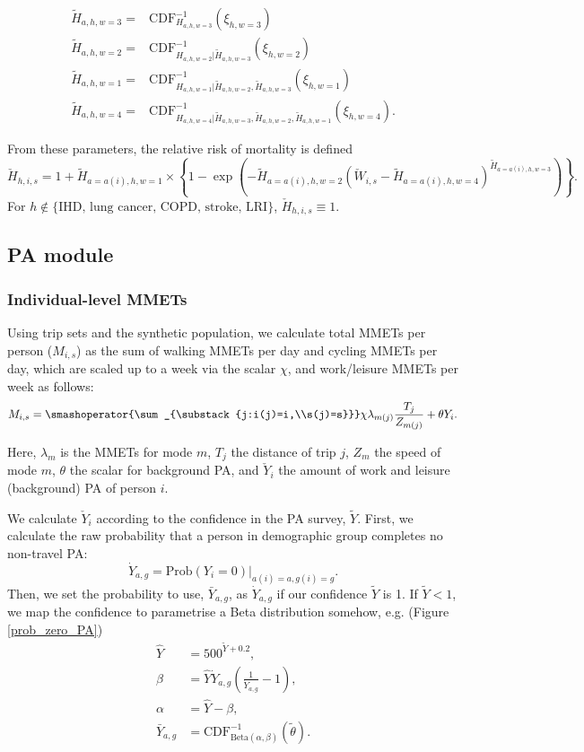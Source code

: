 \documentclass{article}
\begin{document}

\begin{align}\tilde{H}_{a,h,w=3}=&\text{CDF}_{H_{a,h,w=3}}^{-1}(\xi_{h,w=3})\\
\tilde{H}_{a,h,w=2}=&\text{CDF}_{H_{a,h,w=2}|\tilde{H}_{a,h,w=3}}^{-1}(\xi_{h,w=2})\\
\tilde{H}_{a,h,w=1}=&\text{CDF}_{H_{a,h,w=1}|\tilde{H}_{a,h,w=2},\tilde{H}_{a,h,w=3}}^{-1}(\xi_{h,w=1})\\
\tilde{H}_{a,h,w=4}=&\text{CDF}_{H_{a,h,w=4}|\tilde{H}_{a,h,w=3},\tilde{H}_{a,h,w=2},\tilde{H}_{a,h,w=1}}^{-1}(\xi_{h,w=4}).\end{align}

From these parameters, the relative risk of mortality is defined
$$\check{H}_{h,i,s} = 1 + \tilde{H}_{a=a(i),h,w=1}\times
\left\{1 - \exp\left(-\tilde{H}_{a=a(i),h,w=2}  (\check{W}_{i,s} - \tilde{H}_{a=a(i),h,w=4}) ^ {\tilde{H}_{a=a(i),h,w=3} }\right)\right\}.$$
For $h\not\in\{\text{IHD, lung cancer, COPD, stroke, LRI}\}$, $\check{H}_{h,i,s} \equiv 1$.
  
\subsection{PA module}
\subsubsection{Individual-level MMETs}\label{beta}

Using trip sets and the synthetic population, we calculate total MMETs per person ($M_{i,s}$) as the sum of walking MMETs per day and cycling MMETs per day, which are scaled up to a week via the scalar $\chi$, and work/leisure MMETs per week as follows:
\begin{equation}M_{i,s}=\smashoperator{\sum_{\substack{j:i(j)=i,\\s(j)=s}}}
\chi\lambda_{m(j)}\frac{T_j}{Z_{m(j)}}+\theta Y_i.\end{equation}

Here, $\lambda_m$ is the MMETs for mode $m$, $T_j$ the distance of trip $j$, $Z_m$ the speed of mode $m$, $\theta$ the scalar for background PA, and $\check{Y}_i$ the amount of work and leisure (background) PA of person $i$.
  
We calculate $\check{Y}_i$ according to the confidence in the PA survey, $\tilde{Y}$. First, we calculate the raw probability that a person in demographic group completes no non-travel PA:
$$\dot{Y}_{a,g}=\text{Prob}(Y_i=0)|_{a(i)=a,g(i)=g}.$$
Then, we set the probability to use, $\bar{Y}_{a,g}$, as $\dot{Y}_{a,g}$ if our confidence $\tilde{Y}$ is 1. If $\tilde{Y}<1$, we map the confidence to parametrise a Beta distribution somehow, e.g. (Figure \ref{prob_zero_PA})
\begin{align}
\hat{Y} &= 500^{\tilde{Y}+0.2},\\
\beta & = \hat{Y}\dot{Y}_{a,g}\left(\frac{1}{\dot{Y}_{a,g}} -1\right),\\
\alpha & = \hat{Y} - \beta,\\
\bar{Y}_{a,g} & = \text{CDF}_{\text{Beta}(\alpha,\beta)}^{-1}(\tilde{\theta}).
\end{align}
\end{document}
